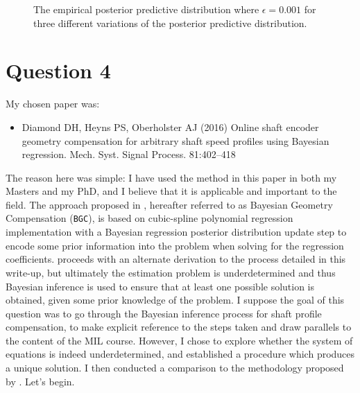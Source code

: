 \documentclass{article}
\begin{document}
\begin{figure}[htb!]
		\caption{The empirical posterior predictive distribution where $\epsilon = 0.001$ for three different variations of the posterior predictive distribution.}
		\label{fig:Q3_post_predict_samples}
	\end{figure}


	\clearpage
	
	\section{Question 4}
	My chosen paper was:
	\begin{itemize}
		\item Diamond DH, Heyns PS, Oberholster AJ (2016) Online shaft encoder geometry compensation for arbitrary shaft speed profiles using Bayesian regression. Mech. Syst. Signal Process. 81:402–418
	\end{itemize}
	
	The reason here was simple: I have used the method in this paper in both my Masters and my PhD, and I believe that it is applicable and important to the field. The approach proposed in \cite{Diamond2016}, hereafter referred to as Bayesian Geometry Compensation (\texttt{BGC}), is based on cubic-spline polynomial regression implementation with a Bayesian regression posterior distribution update step to encode some prior information into the problem when solving for the regression coefficients. \cite{Diamond2016} proceeds with an alternate derivation to the process detailed in this write-up, but ultimately the estimation problem is underdetermined and thus Bayesian inference is used to ensure that at least one possible solution is obtained, given some prior knowledge of the problem. I suppose the goal of this question was to go through the Bayesian inference process for shaft profile compensation, to make explicit reference to the steps taken and draw parallels to the content of the MIL course. However, I chose to explore whether the system of equations is indeed underdetermined, and established a procedure which produces a unique solution. I then conducted a comparison to the methodology proposed by \cite{Diamond2016}. Let's begin.
	
\end{document}
